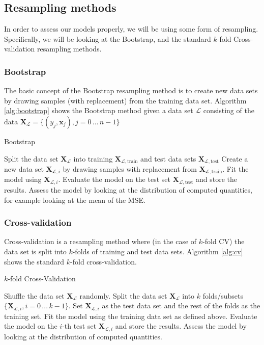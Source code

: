 \documentclass[a4paper]{article}
\newcommand{\XX}{\mathbf{X}}
\begin{document}
\subsection{Resampling methods}
In order to assess our models properly, we will be using some form of resampling. Specifically, we will be looking at the Bootstrap, and the standard $k$-fold Cross-validation resampling methods.
\subsubsection{Bootstrap}
The basic concept of the Bootstrap resampling method is to create new data sets by drawing samples (with replacement) from the training data set. Algorithm \ref{alg:bootstrap} shows the Bootstrap method given a data set $\mathcal{L}$ consisting of the data $\XX_{\mathcal{L}} = \{(y_j, \bm{x}_j), j= 0 \,...\, n-1\}$
\begin{algorithm}[H]
\caption{Bootstrap}
\begin{algorithmic}[1]
\State Split the data set $\XX_{\mathcal{L}}$ into training $\XX_{\mathcal{L},\text{train}}$ and test data sets $\XX_{\mathcal{L},\text{test}}$
\State Create a new data set $\XX_{\mathcal{L},i}$ by drawing samples with replacement from  $\XX_{\mathcal{L},\text{train}}$.
\State Fit the model using $\XX_{\mathcal{L},i}$.
\State Evaluate the model on the test set $\XX_{\mathcal{L},\text{test}}$ and store the results.
\EndFor
\State Assess the model by looking at the distribution of computed quantities, for example looking at the mean of the MSE.
\end{algorithmic}
\label{alg:bootstrap}
\end{algorithm}

\subsubsection{Cross-validation}
Cross-validation is a resampling method where (in the case of $k$-fold CV) the data set is split into $k$-folds of training and test data sets. Algorithm \ref{alg:cv} shows the standard $k$-fold cross-validation.
\begin{algorithm}[H]
\caption{$k$-fold Cross-Validation}
\begin{algorithmic}[1]
\State Shuffle the data set $\XX_{\mathcal{L}}$ randomly.
\State Split the data set $\XX_{\mathcal{L}}$ into $k$ folds/subsets $\{\XX_{\mathcal{L},i}, i=0\,...\,k-1\}$.
\State Set $\XX_{\mathcal{L},i}$ as the test data set and the rest of the folds as the training set.
\State Fit the model using the training data set as defined above.
\State Evaluate the model on the $i$-th test set $\XX_{\mathcal{L},i}$ and store the results.
\EndFor
\State Assess the model by looking at the distribution of computed quantities.%
\end{algorithmic}
\label{alg:cv}
\end{algorithm}
\end{document}
